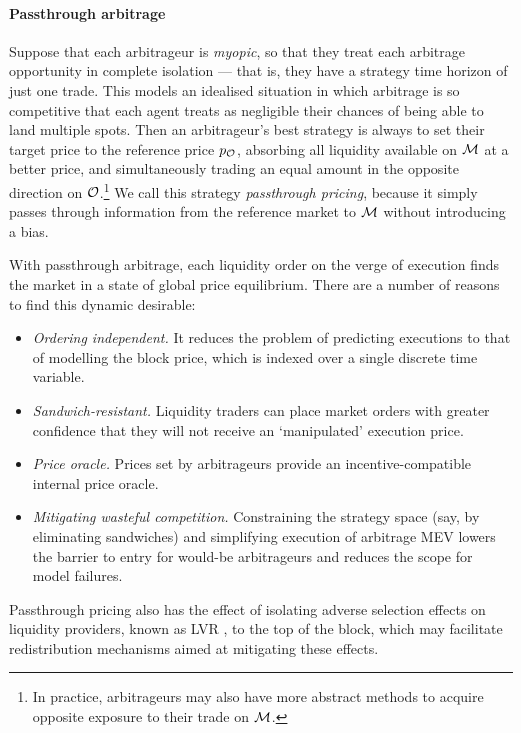 \paragraph{Passthrough arbitrage}
Suppose that each arbitrageur is \emph{myopic}, so that they treat each arbitrage opportunity in complete isolation --- that is, they have a strategy time horizon of just one trade.
%
This models an idealised situation in which arbitrage is so competitive that each agent treats as negligible their chances of being able to land multiple spots.
%
Then an arbitrageur's best strategy is always to set their target price to the reference price $p_{\mathcal{O}}$, absorbing all liquidity available on $\mathcal{M}$ at a better price, and simultaneously trading an equal amount in the opposite direction on $\mathcal{O}$.\footnote{In practice, arbitrageurs may also have more abstract methods to acquire opposite exposure to their trade on $\mathcal{M}$.}
%
We call this strategy \emph{passthrough pricing}, because it simply passes through information from the reference market to $\mathcal{M}$ without introducing a bias.
%

With passthrough arbitrage, each liquidity order on the verge of execution finds the market in a state of global price equilibrium.
%
There are a number of reasons to find this dynamic desirable:
\begin{itemize}    
  \item \emph{Ordering independent.}
    It reduces the problem of predicting executions to that of modelling the block price, which is indexed over a single discrete time variable.
  \item \emph{Sandwich-resistant.}
    Liquidity traders can place market orders with greater confidence that they will not receive an `manipulated' execution price.
  \item \emph{Price oracle.}
    Prices set by arbitrageurs provide an incentive-compatible internal price oracle.
  \item \emph{Mitigating wasteful competition.}
    Constraining the strategy space (say, by eliminating sandwiches) and simplifying execution of arbitrage MEV lowers the barrier to entry for would-be arbitrageurs and reduces the scope for model failures.

\end{itemize}
%
Passthrough pricing also has the effect of isolating adverse selection effects on liquidity providers, known as LVR \cite{milionis2022automated}, to the top of the block, which may facilitate redistribution mechanisms aimed at mitigating these effects.

